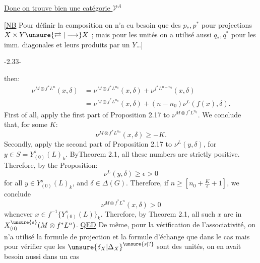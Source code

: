 \uline{Donc on trouve bien une catégorie $\mathcal V^A$}

[\uline{NB} Pour définir la composition on n'a eu besoin que
des $p_*,p^*$ pour projections $X\times Y\unsure{\rightleftarrows|\longrightarrow}X$ ; mais pour
  les unités on a utilisé aussi $q_*,q^*$ pour
les imm. diagonales et leurs produits par un $Y$\ldots]
\begin{center}-2.33-\end{center}
then:
\[
\begin{aligned}
\nu^{M\otimes f^*L^n}(x,\delta)&=\nu^{M\otimes f^*L^{n_0}}(x,\delta)+\nu^{f^*L^{n-n_0}}(x,\delta)\\
&=\nu^{M\otimes f^*L^{n_0}}(x,\delta)+(n-n_0)\nu^L(f(x),\delta).
\end{aligned}
\]
First of all, apply the first part of Proposition 2.17 to $\nu^{M\otimes f^*L^{n_0}}$.
We conclude that, for some $K$:
\[
\nu^{M\otimes f^*L^{n_0}}(x,\delta)\geq-K.
\]
Secondly, apply the second part of Proposition 2.17 to $\nu^L(y,\delta)$,
for $y\in S=Y^s_{(0)}(L)_k$. By\unsure{,,}Theorem 2.1, all these numbers are
strictly positive. Therefore, by the Proposition:
\[
\nu^L(y,\delta)\geq\epsilon>0
\]
for all $y\in Y^s_{(0)}(L)_k$, and $\delta\in\Delta(G)$. Therefore, if $n\geq\left[n_0+\frac K\epsilon+1\right]$,
we conclude
\[
\nu^{M\otimes f^*L^n}(x,\delta)>0
\]
whenever $x\in f^{-1}\{Y^s_{(0)}(L)\}_k$. Therefore, by Theorem 2.1, all such
$x$ are in $X^{\unsure{s}}_{(0)}(M\otimes f^*L^n)$. \uline{QED}
De même, pour la  vérification de l'associativité,
on n'a utilisé la formule de projection et la
formule d'échange que dans le cas
mais pour vérifier que les $\unsure{\delta_X|\Delta_X}^{\unsure{s|?}}$ sont des
unités, on en avait besoin aussi dans un cas

